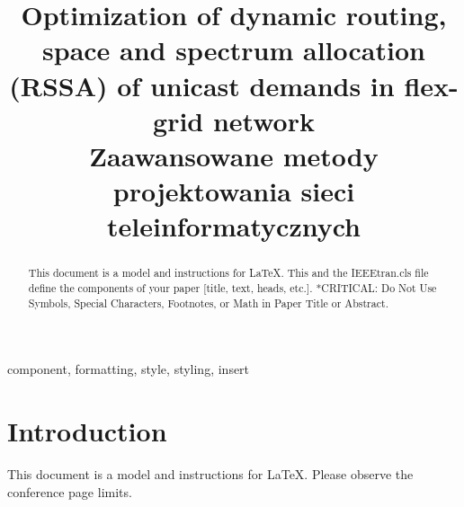 \documentclass[conference]{IEEEtran}
\begin{document}
\title{Optimization of dynamic routing, space and spectrum allocation
(RSSA) of unicast demands in flex-grid network\\
{\footnotesize \textsuperscript{} Zaawansowane metody projektowania sieci teleinformatycznych}
}

\author{
\and
{}
}

\maketitle

\begin{abstract}
This document is a model and instructions for \LaTeX.
This and the IEEEtran.cls file define the components of your paper [title, text, heads, etc.]. *CRITICAL: Do Not Use Symbols, Special Characters, Footnotes, 
or Math in Paper Title or Abstract.
\end{abstract}

\begin{IEEEkeywords}
component, formatting, style, styling, insert
\end{IEEEkeywords}

\section{Introduction}
This document is a model and instructions for \LaTeX.
Please observe the conference page limits. 
\end{document}
